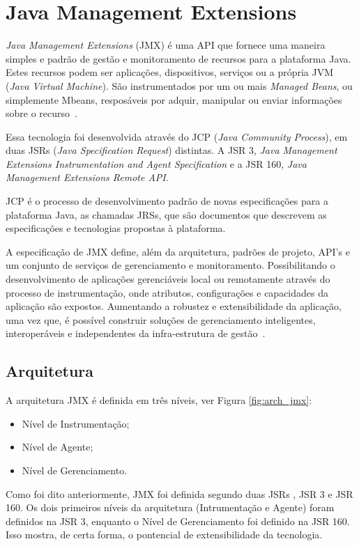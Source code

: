 \chapter{Java Management Extensions}
\label{ch:4}
\textit{Java Management Extensions} (JMX) é uma API que fornece uma maneira simples e padrão de gestão e monitoramento de recursos para a plataforma Java. Estes recursos podem ser aplicações, dispositivos, serviços ou a própria JVM (\textit{Java Virtual Machine}). São instrumentados por um ou mais \textit{Managed Beans}, ou simplemente Mbeans, resposáveis por adquir, manipular ou enviar informações sobre o recurso~\cite{lindfors2002jmx}.

Essa tecnologia foi desenvolvida através do JCP (\textit{Java Community Process}), em duas JSRs (\textit{Java Specification Request}) distintas. A JSR 3, \textit{Java Management Extensions Instrumentation and Agent Specification} e a JSR 160, \textit{Java Management Extensions Remote API}.

JCP é o processo de desenvolvimento padrão de novas especificações para a plataforma Java, as chamadas JRSs, que são documentos que descrevem as especificações e tecnologias propostas à plataforma.

A especificação de JMX define, além da arquitetura, padrões de projeto, API's e um conjunto de serviços de gerenciamento e monitoramento. Possibilitando o desenvolvimento de aplicações gerenciáveis local ou remotamente através do processo de instrumentação, onde atributos, configurações e capacidades da aplicação são expostos. Aumentando a robustez e extensibilidade da aplicação, uma vez que, é possível construir soluções de gerenciamento inteligentes, interoperáveis e independentes da infra-estrutura de gestão~\cite{jmx}.
\newpage

\section{Arquitetura}

A arquitetura JMX é definida em três níveis, ver Figura \ref{fig:arch_jmx}:

\begin{itemize}
 \item Nível de Instrumentação;
 \item Nível de Agente;
 \item Nível de Gerenciamento.
\end{itemize}

Como foi dito anteriormente, JMX foi definida segundo duas JSRs , JSR 3 e JSR 160. Os dois primeiros níveis da arquitetura (Intrumentação e Agente) foram definidos na JSR 3, enquanto o Nível de Gerenciamento foi definido na JSR 160. Isso mostra, de certa forma, o pontencial de extensibilidade da tecnologia.
\newline

